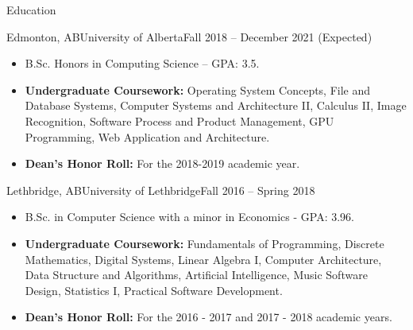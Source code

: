 \documentclass[]{mcdowellcv}
\begin{document}
\makeheader

\begin{cvsection}{ Education}
  \begin{cvsubsection}{Edmonton, AB}{University of Alberta}{Fall 2018 -- December 2021 (Expected)}
    \begin{itemize}
      \item B.Sc. Honors in Computing Science -- GPA: 3.5.
      \item \textbf{Undergraduate Coursework:} Operating System Concepts, File and Database Systems,
        Computer Systems and Architecture II, Calculus II, Image Recognition, Software Process and Product Management, GPU Programming,
        Web Application and Architecture.
      \item \textbf{Dean's Honor Roll:} For the 2018-2019 academic year. 
    \end{itemize}
  \end{cvsubsection}

  \begin{cvsubsection}{Lethbridge, AB}{University of Lethbridge}{Fall 2016 -- Spring 2018}
    \begin{itemize}   
      \item B.Sc. in Computer Science with a minor in Economics - GPA: 3.96.
      \item \textbf{Undergraduate Coursework:} Fundamentals of Programming, Discrete Mathematics, 
        Digital Systems, Linear Algebra I, Computer Architecture, Data Structure and Algorithms, 
        Artificial Intelligence, Music Software Design, Statistics I, Practical Software Development.
      \item \textbf{Dean's Honor Roll:} For the 2016 - 2017 and 2017 - 2018 academic years.
    \end{itemize}
  \end{cvsubsection}
\end{cvsection}

\vspace*{-10pt}
\end{document}
